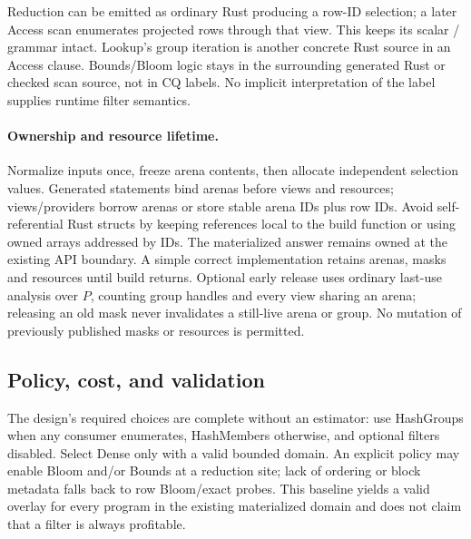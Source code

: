 Reduction can be emitted as ordinary Rust producing a row-ID selection;
a later Access scan enumerates projected rows through that view. This keeps
its scalar / grammar intact. Lookup's group iteration is
another concrete Rust source in an Access clause. Bounds/Bloom logic stays
in the surrounding generated Rust or checked scan source, not in CQ labels.
No implicit interpretation of the label supplies runtime filter semantics.

\paragraph{Ownership and resource lifetime.}
Normalize inputs once, freeze arena contents, then allocate independent
selection values. Generated statements bind arenas before views and resources;
views/providers borrow arenas or store stable arena IDs plus row IDs. Avoid
self-referential Rust structs by keeping references local to the build function
or using owned arrays addressed by IDs. The materialized answer remains owned
at the existing API boundary. A simple correct implementation retains arenas,
masks and resources until build returns. Optional early release uses ordinary
last-use analysis over $P$, counting group handles and every view sharing an
arena; releasing an old mask never invalidates a still-live arena or group.
No mutation of previously published masks or resources is permitted.

\subsection{Policy, cost, and validation}
\label{sec:ya-cost}
The design's required choices are complete without an estimator: use
HashGroups when any consumer enumerates, HashMembers otherwise, and optional
filters disabled. Select Dense only with a valid bounded domain. An explicit
policy may enable Bloom and/or Bounds at a reduction site; lack of ordering
or block metadata falls back to row Bloom/exact probes. This baseline yields
a valid overlay for every program in the existing materialized domain and
does not claim that a filter is always profitable.


